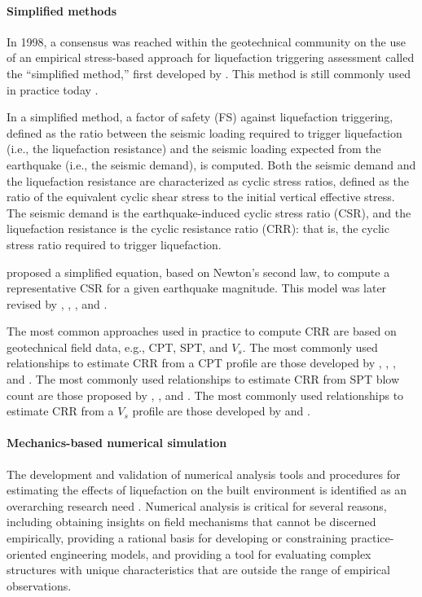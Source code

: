 \paragraph{Simplified methods} 
In 1998, a consensus was reached within the geotechnical community on the use of an empirical stress-based approach for liquefaction triggering assessment called the ``simplified method,'' first developed by \citet{seed1971simplified}. This method is still commonly used in practice today \citep{youd2001liquefaction,national2016state}.

In a simplified method, a factor of safety (FS) against liquefaction triggering, defined as the ratio between the seismic loading required to trigger liquefaction (i.e., the liquefaction resistance) and the seismic loading expected from the earthquake (i.e., the seismic demand), is computed. Both the seismic demand and the liquefaction resistance are characterized as cyclic stress ratios, defined as the ratio of the equivalent cyclic shear stress to the initial vertical effective stress. The seismic demand is the earthquake-induced cyclic stress ratio (CSR), and the liquefaction resistance is the cyclic resistance ratio (CRR): that is, the cyclic stress ratio required to trigger liquefaction. 

\citet{seed1971simplified} proposed a simplified equation, based on Newton's second law, to compute a representative CSR for a given earthquake magnitude. This model was later revised by \citet{idriss1999update}, \citet{cetin2004nonlinear}, \citet{idriss2008soil}, and \citet{boulanger2014cpt}.

The most common approaches used in practice to compute CRR are based on geotechnical field data, e.g., CPT, SPT, and $V_s$.
The most commonly used relationships to estimate CRR from a CPT profile are those developed by \citet{robertson1998evaluating}, \citet{moss2006cpt}, \citet{idriss2008soil}, and \citet{robertson2009interpretation}.
The most commonly used relationships to estimate CRR from SPT blow count are those proposed by \citet{youd2001liquefaction}, \citet{boulanger2014cpt}, and \citet{cetin2018sptbased}. 
The most commonly used relationships to estimate CRR from a $V_s$ profile are those developed by \citet{andrus2000liquefaction} and \citet{kayen2013shearwave}.

\paragraph{Mechanics-based numerical simulation} The development and validation of numerical analysis tools and procedures for estimating the effects of liquefaction on the built environment is identified as an overarching research need \citep{bray2017new}. Numerical analysis is critical for several reasons, including obtaining insights on field mechanisms that cannot be discerned empirically, providing a rational basis for developing or constraining practice-oriented engineering models, and providing a tool for evaluating complex structures with unique characteristics that are outside the range of empirical observations. 

